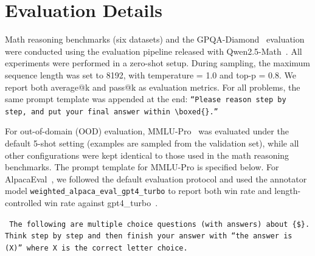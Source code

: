 \newpage
\section{Evaluation Details}
\label{app:eval}
Math reasoning benchmarks (six datasets) and the GPQA-Diamond~\cite{rein2024gpqa} evaluation were conducted using the evaluation pipeline released with Qwen2.5-Math~\cite{yang2024qwen2}. All experiments were performed in a zero-shot setup. During sampling, the maximum sequence length was set to 8192, with temperature = 1.0 and top-p = 0.8. We report both average@k and pass@k as evaluation metrics. For all problems, the same prompt template was appended at the end:
\texttt{``Please reason step by step, and put your final answer within \textbackslash boxed\{\}.''}

For out-of-domain (OOD) evaluation, MMLU-Pro~\cite{wang2024mmlu} was evaluated under the default 5-shot setting (examples are sampled from the validation set), while all other configurations were kept identical to those used in the math reasoning benchmarks. The prompt template for MMLU-Pro is specified below. For AlpacaEval~\cite{dubois2024length}, we followed the default evaluation protocol and used the annotator model \texttt{weighted\_alpaca\_eval\_gpt4\_turbo} to report both win rate and length-controlled win rate against gpt4\_turbo~\cite{achiam2023gpt}.

\begin{mdframed}[linewidth=0.8pt, roundcorner=5pt]
\texttt{
The following are multiple choice questions (with answers) about \{\$\}. 
Think step by step and then finish your answer with ``the answer is (X)'' 
where X is the correct letter choice.
}
\end{mdframed}
